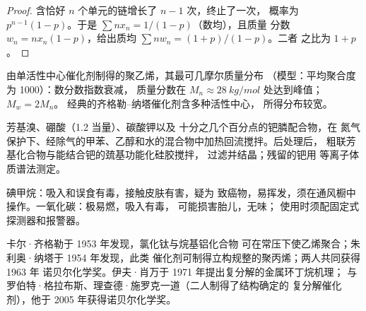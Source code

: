 \begin{proof}
含恰好 $n$ 个单元的链增长了 $n - 1$ 次，终止了一次，
概率为 $p^{n-1}(1 - p)$。于是 $\sum nx_n = 1/(1 - p)$（数均），且质量
分数 $w_n = nx_n(1 - p)$，给出质均 $\sum nw_n = (1 + p)/(1 - p)$。二者
之比为 $1 + p$。
\end{proof}

\begin{omfigure}

{\small 由单活性中心催化剂制得的聚乙烯，其最可几摩尔质量分布
（模型：平均聚合度为 1000）：数分数指数衰减，
质量分数在 $M_n \approx \qty{28}{kg/mol}$ 处达到峰值；$M_w = 2M_n$。
经典的齐格勒–纳塔催化剂含多种活性中心，
所得分布较宽。}
\end{omfigure}

\begin{inthelab}[铃木–宫浦偶联及其钯]
芳基溴、硼酸（1.2 当量）、碳酸钾以及
十分之几个百分点的钯膦配合物，在
氮气保护下、经除气的甲苯、乙醇和水的混合物中加热回流搅拌。后处理后，
粗联芳基化合物与能结合钯的巯基功能化硅胶搅拌，
过滤并结晶；残留的钯用
等离子体质谱法测定。
\end{inthelab}

\begin{safety}{}
碘甲烷：吸入和误食有毒，接触皮肤有害，疑为
致癌物，易挥发，须在通风橱中操作。一氧化碳：极易燃，吸入有毒，
可能损害胎儿，无味；
使用时须配固定式探测器和报警器。
\end{safety}

\begin{history}
卡尔·齐格勒于 1953 年发现，氯化钛与烷基铝化合物
可在常压下使乙烯聚合；朱利奥·纳塔于 1954 年发现，此类
催化剂可制得立构规整的聚丙烯；两人共同获得 1963 年
诺贝尔化学奖。伊夫·肖万于 1971 年提出复分解的金属环丁烷机理；
与罗伯特·格拉布斯、理查德·施罗克一道（二人制得了结构确定的
复分解催化剂），他于 2005 年获得诺贝尔化学奖。
\end{history}

